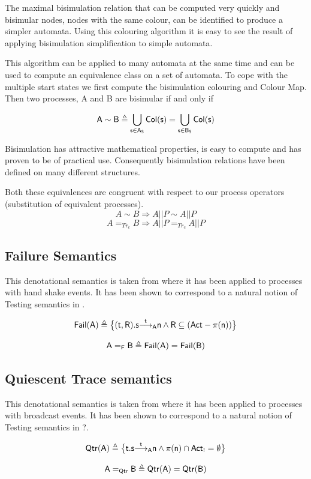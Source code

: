 \documentclass[]{article}
\begin{document}
 The maximal bisimulation relation that  can be computed very quickly and  bisimular nodes, nodes with the same colour, can be identified to produce a simpler automata. 
 Using this colouring algorithm it is easy to see the result of applying  bisimulation simplification to simple automata.

 This algorithm can be applied to many automata at the same time and can be used to compute an equivalence   class on a set of   automata.
 To cope with the multiple start states we first compute the bisimulation colouring and {\sf Colour Map}. Then two processes, {\sf A} and {\sf B}  are bisimular if and only if 
 
 \[ \sf  A\sim B \triangleq \bigcup_{s\in A_S} Col(s)  = \bigcup_{s\in B_S} Col(s) \]
 
 Bisimulation has  attractive mathematical properties, is easy to compute and has proven to be of practical use. Consequently bisimulation relations have been defined on many different structures.

Both these equivalences are congruent with respect to our process operators (substitution of equivalent processes).
\[ A\sim B \Rightarrow A||P\sim A||P\]
\[ A =_{Tr_{c}}  B  \Rightarrow  A||P =_{Tr_{c}}  A||P\]


\subsection{Failure Semantics}
This denotational semantics is taken from \cite{CSP} where it has been applied to processes with hand shake events. It has been shown to correspond to a natural notion of Testing semantics in \cite{}.

\[ \sf Fail(A) \triangleq \big\{(t,R) . \arop{s}{t}{n}{A} \land R \subseteq (Act -\pi(n)) \big\}\]

\[\sf A=_F B \triangleq Fail(A) = Fail(B)\]


\subsection{Quiescent Trace semantics}
This denotational semantics is taken from \cite{IOA} where it has been applied to processes with broadcast events. It has been shown to correspond to a natural notion of Testing semantics in {\sf ?}.

\[ \sf Qtr(A) \triangleq \big\{t . \arop{s}{t}{n}{A} \land \pi(n) \cap Act_{!} = \emptyset \big\}\]

\[\sf A=_{Qtr} B \triangleq Qtr(A) = Qtr(B)\]
\end{document}
